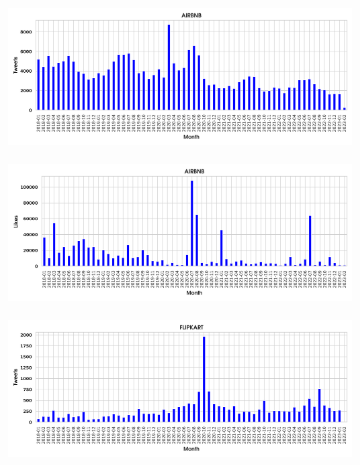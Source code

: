\begin{figure}[t]
    \centering
    \begin{subfigure}[b]{0.45\textwidth}
         \centering
         \includegraphics[width=1\textwidth,scale=1]{images/company_tweets_vs_time/airbnb_tweets.png}
         \caption{}
    \end{subfigure}
    \begin{subfigure}[b]{0.45\textwidth}
         \centering
         \includegraphics[width=1\textwidth,scale=1]{images/company_tweets_vs_time/airbnb_likes.png}
         \caption{}
    \end{subfigure}
    \begin{subfigure}[b]{0.45\textwidth}
         \centering
         \includegraphics[width=1\textwidth,scale=1]{images/company_tweets_vs_time/flipkart_tweets.png}
         \caption{}
    \end{subfigure}
    \begin{subfigure}[b]{0.45\textwidth}

\end{subfigure}
\end{figure}
